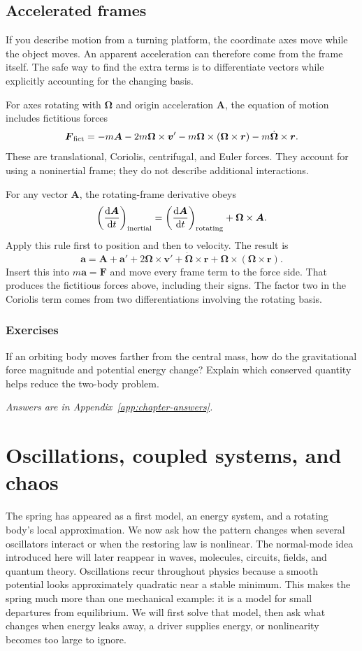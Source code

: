 \documentclass[11pt,oneside]{book}
\newcommand{\dd}{\mathrm{d}}
\newcommand{\vect}[1]{\boldsymbol{#1}}
\newcommand{\od}[2]{\frac{\dd #1}{\dd #2}}
\theoremstyle{reviewstyle}
\newcommand{\learningcheck}[1]{\subsection*{Exercises}\noindent #1\par\smallskip\noindent\emph{Answers are in Appendix~\ref{app:chapter-answers}.}}
\begin{document}
\section{Accelerated frames}
If you describe motion from a turning platform, the coordinate axes move while the object moves. An apparent acceleration can therefore come from the frame itself. The safe way to find the extra terms is to differentiate vectors while explicitly accounting for the changing basis.

For axes rotating with $\vect\Omega$ and origin acceleration $\vect A$, the equation of motion includes fictitious forces
\begin{equation}
\vect F_{\rm fict}=-m\vect A-2m\vect\Omega\times\vect v'
-m\vect\Omega\times(\vect\Omega\times\vect r)
-m\dot{\vect\Omega}\times\vect r.
\end{equation}
These are translational, Coriolis, centrifugal, and Euler forces. They account for using a noninertial frame; they do not describe additional interactions.

For any vector $\vect A$, the rotating-frame derivative obeys
\begin{equation}
\left(\od{\vect A}{t}\right)_{\rm inertial}
=\left(\od{\vect A}{t}\right)_{\rm rotating}+\vect\Omega\times\vect A.
\end{equation}
Apply this rule first to position and then to velocity. The result is
\begin{equation}
\vect a=\vect A+\vect a'+2\vect\Omega\times\vect v'
+\dot{\vect\Omega}\times\vect r+\vect\Omega\times(\vect\Omega\times\vect r).
\end{equation}
Insert this into $m\vect a=\vect F$ and move every frame term to the force side. That produces the fictitious forces above, including their signs. The factor two in the Coriolis term comes from two differentiations involving the rotating basis.

\learningcheck{If an orbiting body moves farther from the central mass, how do the gravitational force magnitude and potential energy change? Explain which conserved quantity helps reduce the two-body problem.}

\chapter{Oscillations, coupled systems, and chaos}
The spring has appeared as a first model, an energy system, and a rotating body's local approximation. We now ask how the pattern changes when several oscillators interact or when the restoring law is nonlinear. The normal-mode idea introduced here will later reappear in waves, molecules, circuits, fields, and quantum theory.
Oscillations recur throughout physics because a smooth potential looks approximately quadratic near a stable minimum. This makes the spring much more than one mechanical example: it is a model for small departures from equilibrium. We will first solve that model, then ask what changes when energy leaks away, a driver supplies energy, or nonlinearity becomes too large to ignore.
\end{document}
